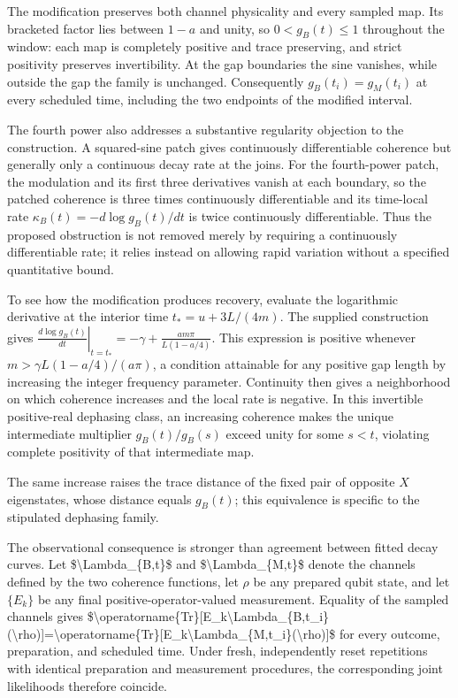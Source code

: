 \documentclass[11pt]{article}
\begin{document}
The modification preserves both channel physicality and every sampled map. Its bracketed factor lies between $1-a$ and unity, so $0<g_B(t)\leq1$ throughout the window: each map is completely positive and trace preserving, and strict positivity preserves invertibility. At the gap boundaries the sine vanishes, while outside the gap the family is unchanged. Consequently $g_B(t_i)=g_M(t_i)$ at every scheduled time, including the two endpoints of the modified interval.

The fourth power also addresses a substantive regularity objection to the construction. A squared-sine patch gives continuously differentiable coherence but generally only a continuous decay rate at the joins. For the fourth-power patch, the modulation and its first three derivatives vanish at each boundary, so the patched coherence is three times continuously differentiable and its time-local rate $\kappa_B(t)=-d\log g_B(t)/dt$ is twice continuously differentiable. Thus the proposed obstruction is not removed merely by requiring a continuously differentiable rate; it relies instead on allowing rapid variation without a specified quantitative bound.

To see how the modification produces recovery, evaluate the logarithmic derivative at the interior time $t_*=u+3L/(4m)$. The supplied construction gives $\left.\frac{d\log g_B(t)}{dt}\right|_{t=t_*}=-\gamma+\frac{am\pi}{L(1-a/4)}.$ This expression is positive whenever $m>\gamma L(1-a/4)/(a\pi)$, a condition attainable for any positive gap length by increasing the integer frequency parameter. Continuity then gives a neighborhood on which coherence increases and the local rate is negative. In this invertible positive-real dephasing class, an increasing coherence makes the unique intermediate multiplier $g_B(t)/g_B(s)$ exceed unity for some $s<t$, violating complete positivity of that intermediate map.

The same increase raises the trace distance of the fixed pair of opposite $X$ eigenstates, whose distance equals $g_B(t)$; this equivalence is specific to the stipulated dephasing family.

The observational consequence is stronger than agreement between fitted decay curves. Let \$\textbackslash{}Lambda\_\{B,t\}\$ and \$\textbackslash{}Lambda\_\{M,t\}\$ denote the channels defined by the two coherence functions, let $\rho$ be any prepared qubit state, and let $\{E_k\}$ be any final positive-operator-valued measurement. Equality of the sampled channels gives \$\textbackslash{}operatorname\{Tr\}[E\_k\textbackslash{}Lambda\_\{B,t\_i\}(\textbackslash{}rho)]=\textbackslash{}operatorname\{Tr\}[E\_k\textbackslash{}Lambda\_\{M,t\_i\}(\textbackslash{}rho)]\$ for every outcome, preparation, and scheduled time. Under fresh, independently reset repetitions with identical preparation and measurement procedures, the corresponding joint likelihoods therefore coincide.
\end{document}
